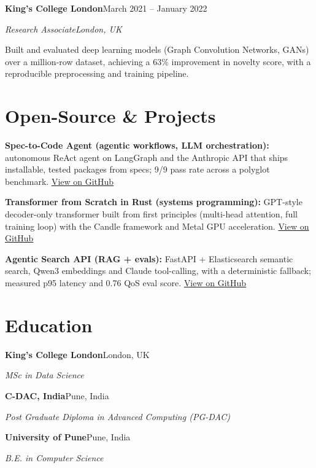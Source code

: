 \documentclass[10pt,a4paper]{article}
\newcommand{\entry}[4]{%
  {\color{company}\bfseries #1}\hfill {\color{muted}#2}\par
  \vspace{1pt}
  {\itshape #3}\hfill {\color{muted}\itshape #4}\par
  \vspace{3pt}%
}
\begin{document}
\entry{King's College London}{March 2021 -- January 2022}{Research Associate}{London, UK}
\begin{tight}
  \item Built and evaluated deep learning models (Graph Convolution Networks, GANs) over a million-row dataset, achieving a 63\% improvement in novelty score, with a reproducible preprocessing and training pipeline.
\end{tight}

\section{Open-Source \& Projects}
\begin{tight}
  \item \textbf{Spec-to-Code Agent (agentic workflows, LLM orchestration):} autonomous ReAct agent on LangGraph and the Anthropic API that ships installable, tested packages from specs; 9/9 pass rate across a polyglot benchmark. \href{https://github.com/abhijeetscode/Spec-to-Code-Agent}{View on GitHub}
  \item \textbf{Transformer from Scratch in Rust (systems programming):} GPT-style decoder-only transformer built from first principles (multi-head attention, full training loop) with the Candle framework and Metal GPU acceleration. \href{https://github.com/abhijeetscode/transformer-rust}{View on GitHub}
  \item \textbf{Agentic Search API (RAG + evals):} FastAPI + Elasticsearch semantic search, Qwen3 embeddings and Claude tool-calling, with a deterministic fallback; measured p95 latency and 0.76 QoS eval score. \href{https://github.com/abhijeetscode/search-agent}{View on GitHub}
\end{tight}

\section{Education}
{\color{company}\bfseries King's College London}\hfill {\color{muted}London, UK}\par
{\itshape MSc in Data Science}\par\vspace{2pt}
{\color{company}\bfseries C-DAC, India}\hfill {\color{muted}Pune, India}\par
{\itshape Post Graduate Diploma in Advanced Computing (PG-DAC)}\par\vspace{2pt}
{\color{company}\bfseries University of Pune}\hfill {\color{muted}Pune, India}\par
{\itshape B.E. in Computer Science}\par
\end{document}
